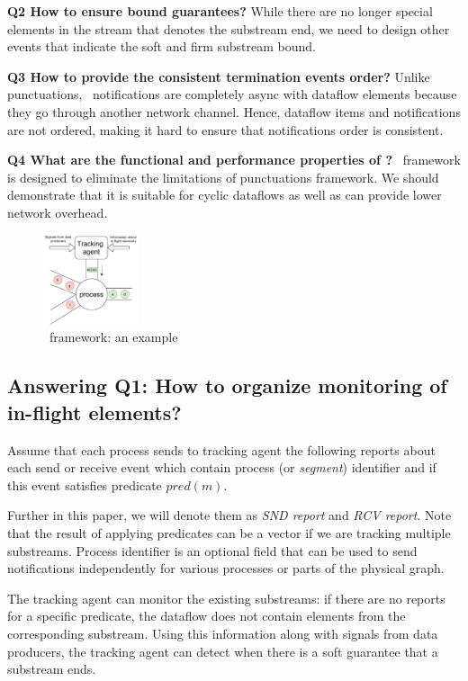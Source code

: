 {\bf Q2 How to ensure bound guarantees?} While there are no longer special elements in the stream that denotes the substream end, we need to design other events that indicate the soft and firm substream bound. 

{\bf Q3 How to provide the consistent termination events order?} Unlike punctuations, \tracker\ notifications are completely async with dataflow elements because they go through another network channel. Hence, dataflow items and notifications are not ordered, making it hard to ensure that notifications order is consistent.

{\bf Q4 What are the functional and performance properties of \tracker?} \tracker\ framework is designed to eliminate the limitations of punctuations framework. We should demonstrate that it is suitable for cyclic dataflows as well as can provide lower network overhead.

\begin{figure}[htbp]
  \centering
  \includegraphics[width=0.25\textwidth]{pics/tracker-scheme.pdf}
  \caption{\tracker\ framework: an example}
  \label{tracker_scheme}
\end{figure}

\subsection{Answering Q1: How to organize monitoring of in-flight elements?}
Assume that each process sends to tracking agent the following reports about each send or receive event which contain process (or {\em segment}) identifier and if this event satisfies predicate $pred(m)$.

Further in this paper, we will denote them as {\em SND report} and {\em RCV report}. Note that the result of applying predicates can be a vector if we are tracking multiple substreams. Process identifier is an optional field that can be used to send notifications independently for various processes or parts of the physical graph.

The tracking agent can monitor the existing substreams: if there are no reports for a specific predicate, the dataflow does not contain elements from the corresponding substream. Using this information along with signals from data producers, the tracking agent can detect when there is a soft guarantee that a substream ends.

